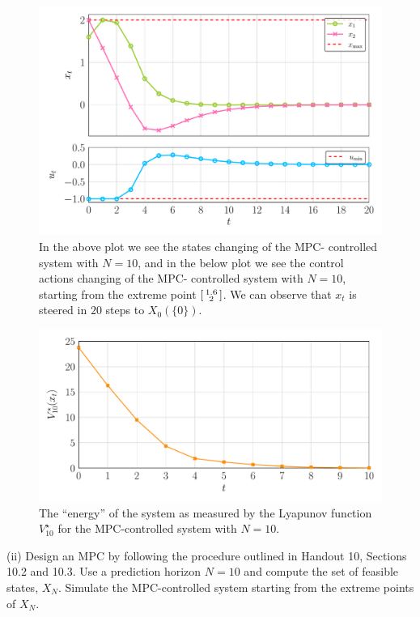 \documentclass[a4paper,11pt,reqno]{amsart}
\begin{document}
\begin{figure}[H]
    \centering
    \vspace{-0.35cm}
    \includegraphics[width=0.7\linewidth]{figures/q3_i_xt_ut.pdf}
    \caption{In the above plot we see the states changing of the MPC-
    controlled system with $N = 10$, and in the below plot we see the control actions changing of the MPC-
    controlled system with $N = 10$, starting from the extreme point $\begin{bsmallmatrix}1.6\\2\end{bsmallmatrix}$. 
    We can observe that $x_t$ is steered in $20$ steps to $X_0(\{0\})$.}
    \label{fig:q3_i_xt_ut}
\end{figure}
\begin{figure}[H]
    \centering
    \vspace{-0.35cm}
    \includegraphics[width=0.7\linewidth]{figures/q3_i_cost.pdf}
    \caption{The ``energy'' of the system as measured by the Lyapunov function $V^{\star}_{10}$ for the MPC-controlled system with $N = 10$.}
    \label{fig:q3_i_cost}
\end{figure}
(ii) Design an MPC by following the procedure outlined in Handout 10, Sections 10.2 and 10.3. Use
a prediction horizon $N=10$ and compute the set of feasible states, $X_N$. Simulate the MPC-controlled
system starting from the extreme points of $X_N$.
\\ \\
\end{document}
